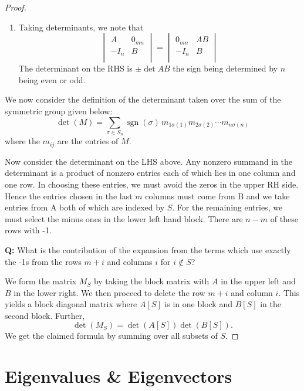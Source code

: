 \documentclass[10pt, letterpaper]{article}
\theoremstyle{remark}
\theoremstyle{definition}
\begin{document}
\begin{proof}
\begin{enumerate}
            \item Taking determinants, we note that
            \[
                \begin{vmatrix}
                    A & 0_{mn} \\
                    -I_n & B \\
                \end{vmatrix} =
                \begin{vmatrix}
                    0_{mn} & AB \\
                    -I_n & B \\
                \end{vmatrix}
            \]
            The determinant on the RHS is $\pm \det AB$ the sign being determined by $n$ being even or odd.
        \end{enumerate}

        We now consider the definition of the determinant taken over the sum of the symmetric group given below:
        \[
            \det(M) = \sum_{\sigma \in S_n} \operatorname{sgn}(\sigma) \, m_{1\sigma(1)} m_{2\sigma(2)} \cdots m_{n\sigma(n)}
        \]
        where the $m_{ij}$ are the entries of $M$.

        Now consider the determinant on the LHS above. Any nonzero summand in the determinant is a product of nonzero entries
        each of which lies in one column and one row. In choosing these entries, we must avoid the zeros in the upper RH side.
        Hence the entries chosen in the last $m$ columns must come from B and we take entries from A both of which are indexed
        by $S$. For the remaining entries, we must select the minus ones in the lower left hand block. There are $n-m$ of
        these rows with -1.

        \textbf{Q: } What is the contribution of the expansion from the terms which use exactly the -1s from the rows
        $m+i$ and columns $i$ for $i \notin S$?

        We form the matrix $M_S$ by taking the block matrix with $A$ in the upper left and $B$ in the lower right. We then
        proceed to delete the row $m+i$ and column $i$.  This yields a block diagonal matrix where $A[S]$ is in one block
        and $B[S]$ in the second block. Further,
        \[
            \det(M_S)=\det(A[S])\det(B[S]).
        \]
        We get the claimed formula by summing over all subsets of $S$.
    \end{proof}

    \section{Eigenvalues \& Eigenvectors}
\end{document}
